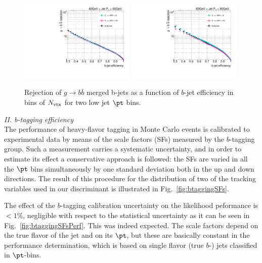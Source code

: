 \begin{figure}[tp]
\centering
\includegraphics[width=0.49\textwidth]{FIGS/systematics/50BinsLlhoodKDE_ISO_PileUp_rejvseff040.pdf}
\includegraphics[width=0.49\textwidth]{FIGS/systematics/50BinsLlhoodKDE_ISO_PileUp_rejvseff060.pdf}
\caption{Rejection of $g\rightarrow b \bar{b}$ merged b-jets as a function of $b$-jet efficiency in bins of $N_{\rm vtx}$ for two low jet $\pt$ bins.}
\label{fig:performanceinbinsMu}
\end{figure}

\vspace{3mm}
{\em II. b-tagging efficiency} %
\\[3mm]
The performance of heavy-flavor tagging in Monte Carlo events is calibrated to experimental data by means of the scale factors (SFs) measured by the $b$-tagging group. %
Such a measurement carries a systematic uncertainty, and in order to estimate its effect a conservative approach is followed: %
the SFs are varied in all the $\pt$ bins simultaneously by one standard deviation both in the up and down directions. The result of this procedure for the distribution of two of the tracking variables used in our discriminant is illustrated in Fig.~\ref{fig:btaggingSFs}. 

The effect of the $b$-tagging calibration uncertainty on the likelihood peformance is $< 1$\%, negligible with respect to the statistical uncertainty as it can be seen in Fig.~\ref{fig:btaggingSFsPerf}.
This was indeed expected. The scale factors depend on the true flavor of the jet and on its $\pt$, but these are basically constant in the performance determination, which is based on single flavor (true $b$-) jets classified in $\pt$-bins.

